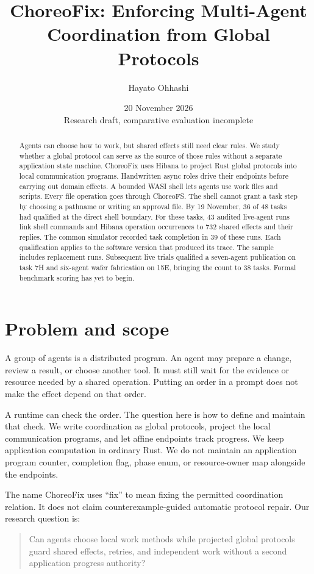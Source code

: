 \documentclass[10pt]{article}
\title{ChoreoFix: Enforcing Multi-Agent Coordination from Global Protocols}
\author{Hayato Ohhashi}
\date{20 November 2026\\Research draft, comparative evaluation incomplete}
\begin{document}
\maketitle
\begin{abstract}
Agents can choose how to work, but shared effects still need clear rules.
We study whether a global protocol can serve as the source of those rules
without a separate application state machine. ChoreoFix uses Hibana to project
Rust global protocols into local communication programs. Handwritten async
roles drive their endpoints before carrying out domain effects. A bounded WASI
shell lets agents use work files and scripts. Every file operation goes through
ChoreoFS. The shell cannot grant a task step by choosing a pathname or writing
an approval file.
By 19 November, 36 of 48 tasks had qualified at the direct shell boundary.
For these tasks, 43 audited live-agent runs link shell commands and Hibana
operation occurrences to 732 shared effects and their replies. The common
simulator recorded task completion in 39 of these runs. Each qualification
applies to the software version that produced its trace. The sample includes
replacement runs. Subsequent live trials qualified a seven-agent publication on task 7H and
six-agent wafer fabrication on 15E, bringing the count to 38 tasks. Formal benchmark scoring has yet to begin.
\end{abstract}

\section{Problem and scope}
A group of agents is a distributed program. An agent may prepare a change,
review a result, or choose another tool. It must still wait for the evidence or
resource needed by a shared operation. Putting an order in a prompt does not
make the effect depend on that order.

A runtime can check the order. The question here is how to define and maintain
that check. We write coordination as global protocols, project the local
communication programs, and let affine endpoints track progress. We keep
application computation in ordinary Rust. We do not maintain an application
program counter, completion flag, phase enum, or resource-owner map alongside
the endpoints.

The name ChoreoFix uses ``fix'' to mean fixing the permitted coordination
relation. It does not claim counterexample-guided automatic protocol repair.
Our research question is:
\begin{quote}
Can agents choose local work methods while projected global protocols guard
shared effects, retries, and independent work without a second application
progress authority?
\end{quote}
\end{document}
